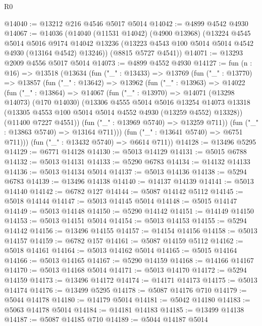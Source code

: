 \begin{lexlean}{R0}
\begin{coremodule}
@14040 := @13212 @216 @4546 @5017 @5014
@14042 := @4899 @4542 @4930
@14067 := @14036
    (@14040
      (@11531 @14042)
      (@4900 @13968)
      (@13224
        @4545
        @5014
        @5016
        @9174
        @14042
        @13236
        (@13223 @4543 @100 @5014 @5014 @4542 @4930 (@13164 @4542) @13246))
      (@8815 @5727 @4541))
@14071 := @13293 @2009 @4556 @5017 @5014
@14073 := @4899 @4552 @4930
@14127 := fun (n : @16) =>
  @13518
    (@13634
      (fun ("_" : @13433) =>
      @13769
        (fun ("_" : @13770) =>
        @13857
          (fun ("_" : @13642) =>
          @13962
            (fun ("_" : @13963) =>
            @14022
              (fun ("_" : @13864) =>
              @14067
                (fun ("_" : @13970) =>
                @14071
                  (@13298 @14073)
                  (@170 @14030)
                  (@13306
                    @4555
                    @5014
                    @5016
                    @13254
                    @14073
                    @13318
                    (@13305 @4553 @100 @5014 @5014 @4552 @4930 (@13259 @4552) @13328))
                  (@11400 @7227 @4551))
                (fun ("_" : @13969 @5740) => @13259 @711))
              (fun ("_" : @13863 @5740) => @13164 @711)))
          (fun ("_" : @13641 @5740) => @6751 @711)))
      (fun ("_" : @13432 @5740) => @6614 @711))
@14128 := @13496 @5295
@14129 := @6771 @14128
@14130 := @5013 @14129
@14131 := @5015 @6788
@14132 := @5013 @14131
@14133 := @5290 @6783
@14134 := @14132 @14133
@14136 := @5013 @14134 @5014
@14137 := @5013 @14136
@14138 := @5294 @6783
@14139 := @13496 @14138
@14140 := @14137 @14139
@14141 := @5013 @14140
@14142 := @6782 @127
@14144 := @5087 @14142 @5112
@14145 := @5018 @14144
@14147 := @5013 @14145 @5014
@14148 := @5015 @14147
@14149 := @5013 @14148
@14150 := @5290 @14142
@14151 := @14149 @14150
@14153 := @5013 @14151 @5014
@14154 := @5013 @14153
@14155 := @5294 @14142
@14156 := @13496 @14155
@14157 := @14154 @14156
@14158 := @5013 @14157
@14159 := @6782 @157
@14161 := @5087 @14159 @5112
@14162 := @5018 @14161
@14164 := @5013 @14162 @5014
@14165 := @5015 @14164
@14166 := @5013 @14165
@14167 := @5290 @14159
@14168 := @14166 @14167
@14170 := @5013 @14168 @5014
@14171 := @5013 @14170
@14172 := @5294 @14159
@14173 := @13496 @14172
@14174 := @14171 @14173
@14175 := @5013 @14174
@14176 := @13499 @5295
@14178 := @5087 @14176 @710
@14179 := @5044 @14178
@14180 := @14179 @5014
@14181 := @5042 @14180
@14183 := @5063 @14178 @5014
@14184 := @14181 @14183
@14185 := @13499 @14138
@14187 := @5087 @14185 @710
@14189 := @5044 @14187 @5014

\end{coremodule}
\end{lexlean}
